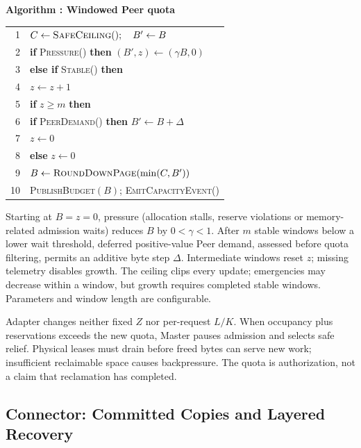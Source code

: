 \par\medskip\noindent\begin{minipage}{\columnwidth}
\raggedright
 \label{alg:adapter}
 \textbf{Algorithm \thedesignalgorithm: Windowed Peer quota}
 \par\smallskip
 \begin{tabularx}{\columnwidth}{@{}r@{\quad}X@{}}
 \toprule
 1 & $C\gets\textsc{SafeCeiling}();\quad B'\gets B$ \\
 2 & \textbf{if} \textsc{Pressure}() \textbf{then} $(B',z)\gets(\gamma B,0)$ \\
 3 & \textbf{else if} \textsc{Stable}() \textbf{then} \\
 4 & \quad $z\gets z+1$ \\
 5 & \quad \textbf{if} $z\ge m$ \textbf{then} \\
 6 & \qquad \textbf{if} \textsc{PeerDemand}() \textbf{then} $B'\gets B+\Delta$ \\
 7 & \qquad $z\gets0$ \\
 8 & \textbf{else} $z\gets0$ \\
 9 & $B\gets\textsc{RoundDownPage}(\min(C,B'))$ \\
 10 & \textsc{PublishBudget}$(B)$; \textsc{EmitCapacityEvent}() \\
 \bottomrule
 \end{tabularx}
\end{minipage}\par\medskip

Starting at $B=z=0$, pressure (allocation stalls, reserve violations or
memory-related admission waits) reduces $B$ by $0<\gamma<1$. After $m$
stable windows below a lower wait threshold, deferred positive-value Peer
demand, assessed before quota filtering, permits an additive byte step
$\Delta$. Intermediate windows reset
$z$; missing telemetry disables growth. The ceiling clips every update;
emergencies may decrease within a window, but growth requires completed
stable windows. Parameters and window length are configurable.

Adapter changes neither fixed $Z$ nor per-request $L/K$. When occupancy
plus reservations exceeds the new quota, Master pauses admission and
selects safe relief. Physical leases must drain before freed bytes can
serve new work; insufficient reclaimable space causes backpressure.
The quota is authorization, not a claim that reclamation has completed.

\subsection{Connector: Committed Copies and Layered Recovery}
\label{sec:connector}


